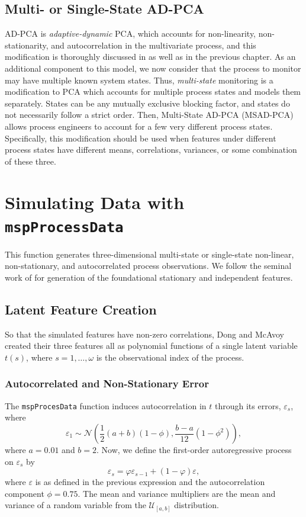 \documentclass{report}\usepackage[]{graphicx}\usepackage[]{color}
\begin{document}
\subsection{Multi- or Single-State AD-PCA}
AD-PCA is \emph{adaptive-dynamic} PCA, which accounts for non-linearity, non-stationarity, and autocorrelation in the multivariate process, and this modification is thoroughly discussed in \cite{kazor_comparison_2016} as well as in the previous chapter. As an additional component to this model, we now consider that the process to monitor may have multiple known system states. Thus, \emph{multi-state} monitoring is a modification to PCA which accounts for multiple process states and models them separately. States can be any mutually exclusive blocking factor, and states do not necessarily follow a strict order. Then, Multi-State AD-PCA (MSAD-PCA) allows process engineers to account for a few very different process states. Specifically, this modification should be used when features under different process states have different means, correlations, variances, or some combination of these three.




\section{Simulating Data with \texttt{mspProcessData}}
This function generates three-dimensional multi-state or single-state non-linear, non-stationary, and autocorrelated process observations. We follow the seminal work of \cite{dong_batch_1996} for generation of the foundational stationary and independent features.


\subsection{Latent Feature Creation}
So that the simulated features have non-zero correlations, Dong and McAvoy created their three features all as polynomial functions of a single latent variable $t(s)$, where $s = 1, \ldots, \omega$ is the observational index of the process.

\subsubsection{Autocorrelated and Non-Stationary Error}
The \texttt{mspProcesData} function induces autocorrelation in $t$ through its errors, $\varepsilon_s$, where
\[
  \varepsilon_1 \sim \mathcal{N}\left(\frac{1}{2}(a + b)(1 - \phi), \frac{b - a}{12} (1 - \phi ^ 2)\right),
\]
where $a = 0.01$ and $b = 2$. Now, we define the first-order autoregressive process on $\varepsilon_s$ by
\[
  \varepsilon_s = \varphi\varepsilon_{s - 1} + (1 - \varphi)\varepsilon,
\]
where $\varepsilon$ is as defined in the previous expression and the autocorrelation component $\phi = 0.75$. The mean and variance multipliers are the mean and variance of a random variable from the $\mathcal{U}_{[a,b]}$ distribution.
\end{document}
